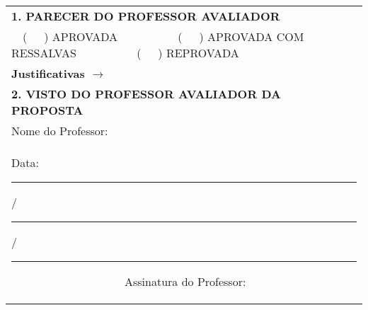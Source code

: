 
\begin{titlepage}
\label{pro:aprovacao}
{\renewcommand{\arraystretch}{1.5}
  \begin{table}[!htp]
    \begin{tabular}{|p{15cm}|} \hline
      \textbf{1. PARECER DO PROFESSOR AVALIADOR} \\
      \ \ (\ \ \ ) APROVADA \ \ \ \ \ \ \ \ \ \  (\ \ \ ) APROVADA COM RESSALVAS \ \ \ \ \ \ \ \ \ \ (\ \ \ ) REPROVADA \\
      \hline
      \textbf{Justificativas $\to$} \\[18.3cm]
      \hline
      \textbf{2. VISTO DO PROFESSOR AVALIADOR DA PROPOSTA} \\
Nome do Professor: \hrulefill \\
Data: \rule{.5cm}{.1mm}/\rule{.5cm}{.1mm}/\rule{1cm}{.1mm} \ \ \ \ \ \ \ \ \ \ \ \ \ \ \ \ \ \ \ \  Assinatura do Professor: \hrulefill \\
      \hline
    \end{tabular}
  \end{table}} \quad
\\
\end{titlepage}
